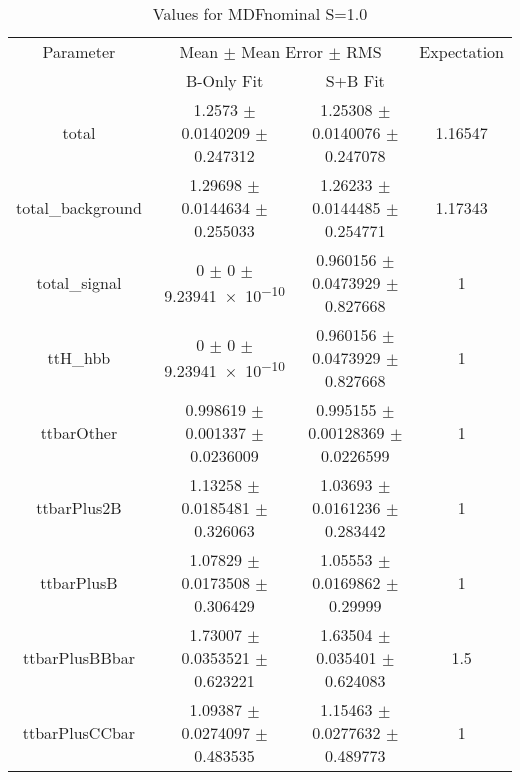 \begin{table}
\centering
\caption{Values for MDFnominal S=1.0}
\begin{tabular}{cccc}
\toprule
Parameter & \multicolumn{2}{c}{Mean $\pm$ Mean Error $\pm$ RMS} & Expectation\\
 & B-Only Fit & S+B Fit & \\
\midrule
total & \num{1.2573} $\pm$ \num{0.0140209} $\pm$ \num{0.247312} & \num{1.25308} $\pm$ \num{0.0140076} $\pm$ \num{0.247078} & \num{1.16547}\\
total\_background & \num{1.29698} $\pm$ \num{0.0144634} $\pm$ \num{0.255033} & \num{1.26233} $\pm$ \num{0.0144485} $\pm$ \num{0.254771} & \num{1.17343}\\
total\_signal & \num{0} $\pm$ \num{0} $\pm$ \num{9.23941e-10} & \num{0.960156} $\pm$ \num{0.0473929} $\pm$ \num{0.827668} & \num{1}\\
ttH\_hbb & \num{0} $\pm$ \num{0} $\pm$ \num{9.23941e-10} & \num{0.960156} $\pm$ \num{0.0473929} $\pm$ \num{0.827668} & \num{1}\\
ttbarOther & \num{0.998619} $\pm$ \num{0.001337} $\pm$ \num{0.0236009} & \num{0.995155} $\pm$ \num{0.00128369} $\pm$ \num{0.0226599} & \num{1}\\
ttbarPlus2B & \num{1.13258} $\pm$ \num{0.0185481} $\pm$ \num{0.326063} & \num{1.03693} $\pm$ \num{0.0161236} $\pm$ \num{0.283442} & \num{1}\\
ttbarPlusB & \num{1.07829} $\pm$ \num{0.0173508} $\pm$ \num{0.306429} & \num{1.05553} $\pm$ \num{0.0169862} $\pm$ \num{0.29999} & \num{1}\\
ttbarPlusBBbar & \num{1.73007} $\pm$ \num{0.0353521} $\pm$ \num{0.623221} & \num{1.63504} $\pm$ \num{0.035401} $\pm$ \num{0.624083} & \num{1.5}\\
ttbarPlusCCbar & \num{1.09387} $\pm$ \num{0.0274097} $\pm$ \num{0.483535} & \num{1.15463} $\pm$ \num{0.0277632} $\pm$ \num{0.489773} & \num{1}\\
\bottomrule
\end{tabular}
\end{table}